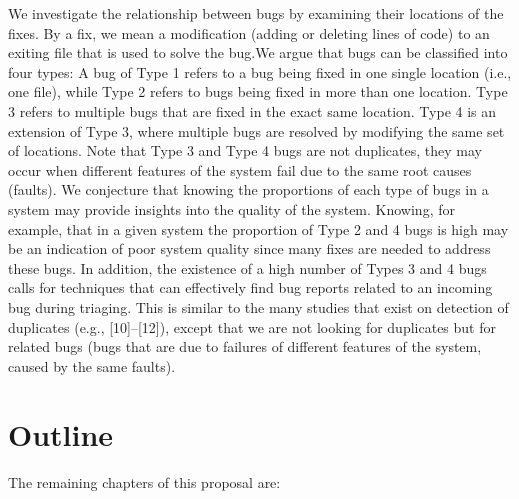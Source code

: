 We investigate the relationship between bugs by examining their locations of the fixes. By a fix, we mean a modification (adding or deleting lines of code) to an exiting file that is used to solve the bug.We argue that bugs can be classified into four types:
A bug of Type 1 refers to a bug being fixed in one single location (i.e., one file), while Type 2 refers to bugs being fixed in more than one location.  Type 3 refers to multiple bugs that are fixed in the exact same location. Type 4 is an extension of Type 3, where multiple bugs are resolved by modifying the same set of locations. Note that Type 3 and Type 4 bugs are not duplicates, they may occur when different features of the system fail due to the same root causes (faults). We conjecture that knowing the proportions of each type of bugs in a system may provide insights into the quality of the system. Knowing, for example, that in a given system the proportion of Type 2 and 4 bugs is high may be an indication of poor system quality since many fixes are needed to address these bugs.  In addition, the existence of a high number of Types 3 and 4 bugs calls for techniques that can effectively find bug reports related to an incoming bug during triaging. This is similar to the many studies that exist on detection of duplicates (e.g., [10]–[12]), except that we are not looking for duplicates but for related bugs (bugs that are due to failures of different features of the system, caused by the same faults). 

\section{Outline\label{sec:outline}}

The remaining chapters of this proposal are:

